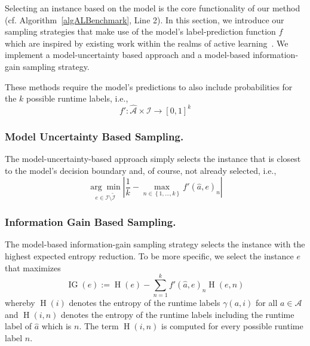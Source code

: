 \documentclass[runningheads]{llncs}
\begin{document}
Selecting an instance based on the model is the core functionality of our method (cf. Algorithm~\ref{algALBenchmark}, Line 2). 
In this section, we introduce our sampling strategies that make use of the model's label-prediction function $f$ which are inspired by existing work within the realms of active learning~\cite{settles2009active}.
We implement a model-uncertainty based approach and a model-based information-gain sampling strategy.

These methods require the model's predictions to also include probabilities for the $k$ possible runtime labels, i.e., 
\begin{equation*}
  f' : \mathcal{\hat A} \times \mathcal{I} \rightarrow \left[0, 1\right]^k
\end{equation*}

\subsubsection{Model Uncertainty Based Sampling.}

The model-uncertainty-based approach simply selects the instance that is closest to the model's decision boundary and, of course, not already selected, i.e.,
\begin{equation*}
  \underset{e \in \mathcal{I} \setminus \tilde{\mathcal{I}}}{\arg\min} \left\lvert \frac{1}{k} - \max_{n \in \left\lbrace 1, \dots, k \right\rbrace} f'\!\left(\hat{a}, e\right)_{n} \right\rvert
\end{equation*}

\subsubsection{Information Gain Based Sampling.}

The model-based information-gain sampling strategy selects the instance with the highest expected entropy reduction.
To be more specific, we select the instance $e$ that maximizes
\begin{equation*}
  \operatorname{IG}(e) := \operatorname{H}(e) - \sum_{n = 1}^{k} f'(\hat{a}, e)_{n} \operatorname{H}(e, n)
\end{equation*}
whereby $\operatorname{H}\!\left(i\right)$ denotes the entropy of the runtime labels $\gamma\!\left(a, i\right)$ for all $a \in \mathcal{A}$ and $\operatorname{H}\!\left(i, n\right)$ denotes the entropy of the runtime labels including the runtime label of $\hat{a}$ which is $n$.
The term $\operatorname{H}\!\left(i, n\right)$ is computed for every possible runtime label $n$.
\end{document}
